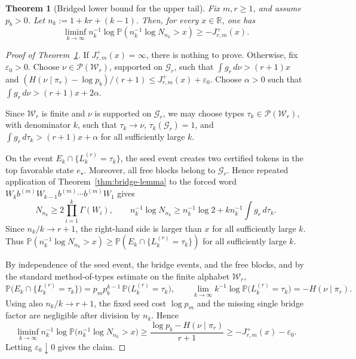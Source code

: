\documentclass[10pt,a4paper]{amsart}
\newtheorem{theorem}{Theorem}
\begin{document}
\begin{theorem}[Bridged lower bound for the upper tail]\label{thm:main-bridge-lower}
Fix \(m,r\ge1\), and assume \(p_b>0\). Let \(n_k:=1+kr+(k-1)\). Then, for every \(x\in\mathbb R\), one has 
\[\liminf_{k\to\infty} n_k^{-1}\log\mathbb P(n_k^{-1}\log N_{n_k}>x)\ge -J_{r,m}^{+}(x).\]
\end{theorem}

\begin{proof}[Proof of Theorem~\ref{thm:main-bridge-lower}]
If \(J_{r,m}^{+}(x)=\infty\), there is nothing to prove. Otherwise, fix
\(\varepsilon_0>0\). Choose \(\nu\in\mathcal P(\mathcal W_r)\), supported on
\(\mathcal G_r\), such that \(\int g_r\,d\nu>(r+1)x\) and
\((H(\nu\mid\pi_r)-\log p_b)/(r+1)\le J_{r,m}^{+}(x)+\varepsilon_0\).
Choose \(\alpha>0\) such that
\(\int g_r\,d\nu>(r+1)x+2\alpha\).

Since \(\mathcal W_r\) is finite and \(\nu\) is supported on \(\mathcal G_r\),
we may choose types \(\tau_k\in\mathcal P(\mathcal W_r)\), with denominator
\(k\), such that \(\tau_k\to\nu\), \(\tau_k(\mathcal G_r)=1\), and
\(\int g_r\,d\tau_k>(r+1)x+\alpha\) for all sufficiently large \(k\).

On the event \(E_k\cap\{L_k^{(r)}=\tau_k\}\), the seed event creates two
certified tokens in the top favorable state \(e_\star\). Moreover, all free
blocks belong to \(\mathcal G_r\). Hence repeated application of
Theorem~\ref{thm:bridge-lemma} to the forced word
\(W_k b^{(m)} W_{k-1} b^{(m)}\cdots b^{(m)}W_1\) gives
\[
N_{n_k}\ge 2\prod_{i=1}^k\Gamma(W_i),
\qquad
n_k^{-1}\log N_{n_k}
\ge n_k^{-1}\log 2+k n_k^{-1}\int g_r\,d\tau_k .
\]
Since \(n_k/k\to r+1\), the right-hand side is larger than \(x\) for all
sufficiently large \(k\). Thus
\(\mathbb P(n_k^{-1}\log N_{n_k}>x)\ge
\mathbb P(E_k\cap\{L_k^{(r)}=\tau_k\})\) for all sufficiently large \(k\).

By independence of the seed event, the bridge events, and the free blocks,
and by the standard method-of-types estimate on the finite alphabet
\(\mathcal W_r\),
\[
\mathbb P\bigl(E_k\cap\{L_k^{(r)}=\tau_k\}\bigr)
=
p_m p_b^{k-1}\,
\mathbb P\bigl(L_k^{(r)}=\tau_k\bigr),
\qquad
\lim_{k\to\infty}
k^{-1}\log \mathbb P\bigl(L_k^{(r)}=\tau_k\bigr)
=
-H(\nu\mid\pi_r).
\]
Using also \(n_k/k\to r+1\), the fixed seed cost \(\log p_m\) and the missing
single bridge factor are negligible after division by \(n_k\). Hence
\[
\liminf_{k\to\infty}
n_k^{-1}\log\mathbb P\bigl(n_k^{-1}\log N_{n_k}>x\bigr)
\ge
\frac{\log p_b-H(\nu\mid\pi_r)}{r+1}
\ge
-J_{r,m}^{+}(x)-\varepsilon_0 .
\]
Letting \(\varepsilon_0\downarrow0\) gives the claim.
\end{proof}
\end{document}
